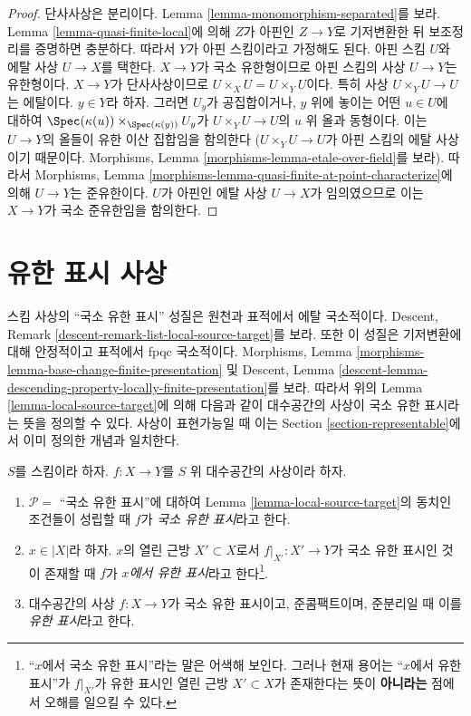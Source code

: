 \begin{proof}
단사사상은 분리이다. Lemma
\ref{lemma-monomorphism-separated}를 보라.
Lemma \ref{lemma-quasi-finite-local}에 의해 $Z$가 아핀인
$Z \to Y$로 기저변환한 뒤 보조정리를 증명하면 충분하다.
따라서 $Y$가 아핀 스킴이라고 가정해도 된다.
아핀 스킴 $U$와 에탈 사상 $U \to X$를 택한다.
$X \to Y$가 국소 유한형이므로 아핀 스킴의 사상 $U \to Y$는
유한형이다. $X \to Y$가 단사사상이므로
$U \times_X U = U \times_Y U$이다.
특히 사상 $U \times_Y U \to U$는 에탈이다.
$y \in Y$라 하자. 그러면 $U_y$가 공집합이거나, $y$ 위에 놓이는
어떤 $u \in U$에 대하여
$\Spec(\kappa(u)) \times_{\Spec(\kappa(y))} U_y$가
$U \times_Y U \to U$의 $u$ 위 올과 동형이다.
이는 $U \to Y$의 올들이 유한 이산 집합임을 함의한다
($U \times_Y U \to U$가 아핀 스킴의 에탈 사상이기 때문이다.
Morphisms, Lemma \ref{morphisms-lemma-etale-over-field}를 보라).
따라서 Morphisms, Lemma
\ref{morphisms-lemma-quasi-finite-at-point-characterize}에 의해
$U \to Y$는 준유한이다. $U$가 아핀인 에탈 사상 $U \to X$가
임의였으므로 이는 $X \to Y$가 국소 준유한임을 함의한다.
\end{proof}

\section{유한 표시 사상}
\label{section-finite-presentation}

\noindent
스킴 사상의 “국소 유한 표시” 성질은 원천과 표적에서 에탈 국소적이다.
Descent, Remark \ref{descent-remark-list-local-source-target}를 보라.
또한 이 성질은 기저변환에 대해 안정적이고 표적에서 fpqc 국소적이다.
Morphisms, Lemma
\ref{morphisms-lemma-base-change-finite-presentation} 및 Descent, Lemma
\ref{descent-lemma-descending-property-locally-finite-presentation}를 보라.
따라서 위의 Lemma \ref{lemma-local-source-target}에 의해 다음과 같이
대수공간의 사상이 국소 유한 표시라는 뜻을 정의할 수 있다.
사상이 표현가능일 때 이는 Section \ref{section-representable}에서
이미 정의한 개념과 일치한다.

\begin{definition}
\label{definition-locally-finite-presentation}
$S$를 스킴이라 하자.
$f : X \to Y$를 $S$ 위 대수공간의 사상이라 하자.
\begin{enumerate}
\item $\mathcal{P} =$ “국소 유한 표시”에 대하여
Lemma \ref{lemma-local-source-target}의 동치인 조건들이 성립할 때
$f$가 {\it 국소 유한 표시}라고 한다.
\item $x \in |X|$라 하자. $x$의 열린 근방 $X' \subset X$로서
$f|_{X'} : X' \to Y$가 국소 유한 표시인 것이 존재할 때
$f$가 {\it $x$에서 유한 표시}라고 한다\footnote{“$x$에서
국소 유한 표시”라는 말은 어색해 보인다. 그러나 현재 용어는
“$x$에서 유한 표시”가 $f|_{X'}$가 유한 표시인 열린 근방
$X' \subset X$가 존재한다는 뜻이 {\bf 아니라는} 점에서
오해를 일으킬 수 있다.}.
\item 대수공간의 사상 $f : X \to Y$가 국소 유한 표시이고,
준콤팩트이며, 준분리일 때 이를 {\it 유한 표시}라고 한다.
\end{enumerate}
\end{definition}

